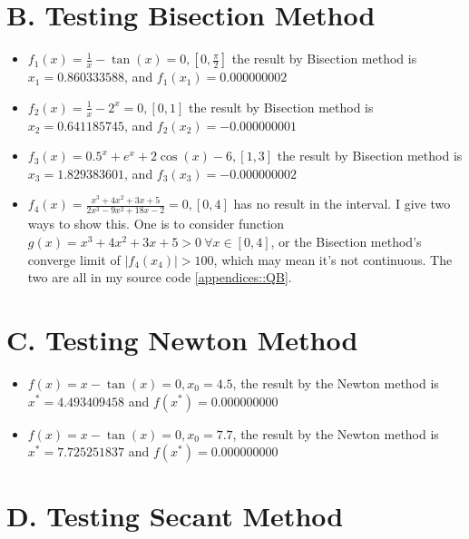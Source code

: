\documentclass[a4paper]{article}
\begin{document}
\section*{B. Testing Bisection Method}

\begin{itemize}
	\item $f_1(x) = \frac{1}{x} - \tan (x) = 0, [0, \frac{\pi}{2}]$ the result by Bisection method is $x_1 = 0.860333588$, and $f_1(x_1) = 0.000000002$
	\item $f_2(x) = \frac{1}{x} - 2^x = 0, [0, 1]$ the result by Bisection method is $x_2 = 0.641185745$, and $f_2(x_2) = -0.000000001$
	\item $f_3(x) = 0.5^x + e^x + 2\cos (x) - 6, [1, 3]$ the result by Bisection method is $x_3 = 1.829383601$, and $f_3(x_3) = -0.000000002$
	\item $f_4(x) = \frac{x^3 + 4x^2 + 3x + 5}{2x^3 - 9x^2 + 18x - 2} = 0, [0, 4]$ has no result in the interval. I give two ways to show this. One is to consider function $g(x) = x^3 + 4x^2 + 3x + 5 > 0 ~ \forall x \in [0, 4]$, or the Bisection method's converge limit of $\vert f_4(x_4) \vert > 100$, which may mean it's not continuous. The two are all in my source code \ref{appendices::QB}. 
\end{itemize}

\section*{C. Testing Newton Method}

\begin{itemize}
	\item $f(x) = x - \tan (x) = 0, x_0=4.5$, the result by the Newton method is $x^* = 4.493409458$ and $f(x^*) = 0.000000000$
	\item $f(x) = x - \tan (x) = 0, x_0=7.7$, the result by the Newton method is $x^* = 7.725251837$ and $f(x^*) = 0.000000000$
\end{itemize}

\section*{D. Testing Secant Method}
\end{document}
